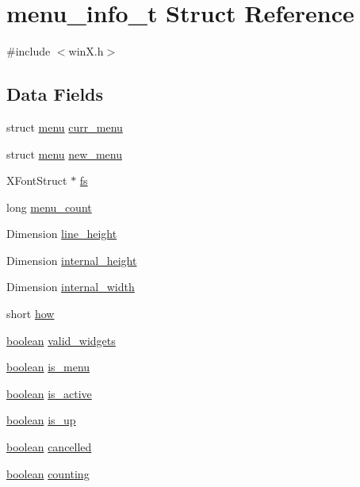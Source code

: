 \hypertarget{structmenu__info__t}{\section{menu\+\_\+info\+\_\+t Struct Reference}
\label{structmenu__info__t}
}


{\ttfamily \#include $<$win\+X.\+h$>$}

\subsection*{Data Fields}
\begin{DoxyCompactItemize}
\item 
struct \hyperlink{structmenu}{menu} \hyperlink{structmenu__info__t_a38a857462707f62f7eaafe8b8bbf9f9c}{curr\+\_\+menu}
\item 
struct \hyperlink{structmenu}{menu} \hyperlink{structmenu__info__t_a9f0590d4ac57838754e95bbfd20c702d}{new\+\_\+menu}
\item 
X\+Font\+Struct $\ast$ \hyperlink{structmenu__info__t_a154f8896fd4e9c248cab6ec1f5006a49}{fs}
\item 
long \hyperlink{structmenu__info__t_ab05c75ece223e9b781e3031dfecefa49}{menu\+\_\+count}
\item 
Dimension \hyperlink{structmenu__info__t_a370a43d822791dc3562033b47299fb8e}{line\+\_\+height}
\item 
Dimension \hyperlink{structmenu__info__t_a0dea626d0109b30b18484e26a2c5733c}{internal\+\_\+height}
\item 
Dimension \hyperlink{structmenu__info__t_a6e17292848a33ea6a90687c997786a43}{internal\+\_\+width}
\item 
short \hyperlink{structmenu__info__t_a96feb8d0ee474a21f1357ac961f0a5ab}{how}
\item 
\hyperlink{global_8h_a531b10dd351aa162d7dcccd1966308b8}{boolean} \hyperlink{structmenu__info__t_ab313bdca14966e71791ea9e53dd3019f}{valid\+\_\+widgets}
\item 
\hyperlink{global_8h_a531b10dd351aa162d7dcccd1966308b8}{boolean} \hyperlink{structmenu__info__t_acdaeddbe7e241346d454cf07ad6ef2bb}{is\+\_\+menu}
\item 
\hyperlink{global_8h_a531b10dd351aa162d7dcccd1966308b8}{boolean} \hyperlink{structmenu__info__t_aa6ca6a4d2dff17cfc00063110467bb33}{is\+\_\+active}
\item 
\hyperlink{global_8h_a531b10dd351aa162d7dcccd1966308b8}{boolean} \hyperlink{structmenu__info__t_add9292ec792c147f95126c726d42f6c9}{is\+\_\+up}
\item 
\hyperlink{global_8h_a531b10dd351aa162d7dcccd1966308b8}{boolean} \hyperlink{structmenu__info__t_a30d245252e40e13b6352f3d81a31190a}{cancelled}
\item 
\hyperlink{global_8h_a531b10dd351aa162d7dcccd1966308b8}{boolean} \hyperlink{structmenu__info__t_a1067a8d44e287117d1f7da3aaa4f62c1}{counting}
\end{DoxyCompactItemize}


